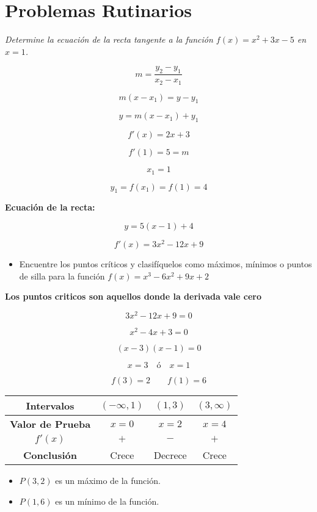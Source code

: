 \section{Problemas Rutinarios}

\textit{Determine la ecuación de la recta tangente a la función \( f(x) = x^2 + 3x - 5 \) en \( x = 1 \).}

\[
m = \frac{y_2 - y_1}{x_2 - x_1}
\]

\[
m(x - x_1) = y - y_1
\]

\[
y = m(x - x_1) + y_1
\]

\[
f'(x) = 2x + 3
\]

\[
f'(1) = 5 = m
\]

\[
x_1 = 1
\]

\[
y_1 = f(x_1) = f(1) = 4
\]

\textbf{Ecuación de la recta:}

\[
y = 5(x - 1) + 4
\]

\[
f'(x) = 3x^2 - 12x + 9
\]

\begin{itemize}
    \item Encuentre los puntos críticos y clasifíquelos como máximos, mínimos o puntos de silla para la función \(f(x)=x^3-6x^2+9x+2\)
\end{itemize}
\textbf{Los puntos criticos son aquellos donde la derivada vale cero}

\[
3x^2 - 12x + 9 = 0
\]

\[
x^2 - 4x + 3 = 0
\]

\[
(x - 3)(x - 1) = 0
\]

\[
x = 3 \quad \text{ó} \quad x = 1
\]

\[
f(3) = 2 \quad \quad f(1) = 6
\]

\begin{center}
    \begin{tabular}{|c|c|c|c|}
        \hline
        \textbf{Intervalos} & $(-\infty, 1)$ & $(1, 3)$ & $(3, \infty)$ \\
        \hline
        \textbf{Valor de Prueba} & $x = 0$ & $x = 2$ & $x = 4$ \\
        \hline
        \textbf{$f'(x)$} & $+$ & $-$ & $+$ \\
        \hline
        \textbf{Conclusión} & Crece & Decrece & Crece \\
        \hline
    \end{tabular}
\end{center}

\begin{itemize}
    \item $P(3, 2)$ es un máximo de la función.
    \item $P(1, 6)$ es un mínimo de la función.
\end{itemize}

